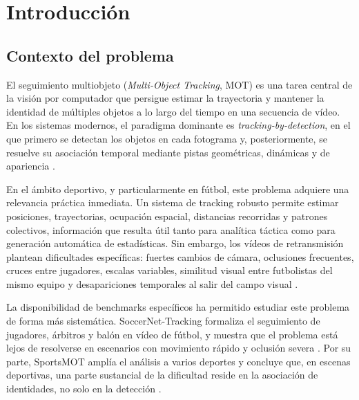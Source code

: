\documentclass[../MAIN.tex]{subfiles}
\begin{document}

\section{Introducción}


\subsection{Contexto del problema}

El seguimiento multiobjeto (\textit{Multi-Object Tracking}, MOT) es una tarea central de la visión por computador que persigue estimar la trayectoria y mantener la identidad de múltiples objetos a lo largo del tiempo en una secuencia de vídeo. En los sistemas modernos, el paradigma dominante es \textit{tracking-by-detection}, en el que primero se detectan los objetos en cada fotograma y, posteriormente, se resuelve su asociación temporal mediante pistas geométricas, dinámicas y de apariencia \parencite{ciaparrone2020survey, wojke2017deepsort, zhang2022bytetrack}.

En el ámbito deportivo, y particularmente en fútbol, este problema adquiere una relevancia práctica inmediata. Un sistema de tracking robusto permite estimar posiciones, trayectorias, ocupación espacial, distancias recorridas y patrones colectivos, información que resulta útil tanto para analítica táctica como para generación automática de estadísticas. Sin embargo, los vídeos de retransmisión plantean dificultades específicas: fuertes cambios de cámara, oclusiones frecuentes, cruces entre jugadores, escalas variables, similitud visual entre futbolistas del mismo equipo y desapariciones temporales al salir del campo visual \parencite{cioppa2022soccernettracking, cui2023sportsmot}.

La disponibilidad de benchmarks específicos ha permitido estudiar este problema de forma más sistemática. SoccerNet-Tracking formaliza el seguimiento de jugadores, árbitros y balón en vídeo de fútbol, y muestra que el problema está lejos de resolverse en escenarios con movimiento rápido y oclusión severa \parencite{cioppa2022soccernettracking}. Por su parte, SportsMOT amplía el análisis a varios deportes y concluye que, en escenas deportivas, una parte sustancial de la dificultad reside en la asociación de identidades, no solo en la detección \parencite{cui2023sportsmot}.
\end{document}
